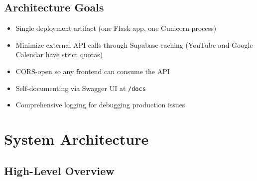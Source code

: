 \documentclass[12pt]{article}
\begin{document}
\subsection{Architecture Goals}
\begin{itemize}
    \item Single deployment artifact (one Flask app, one Gunicorn process)
    \item Minimize external API calls through Supabase caching (YouTube and Google Calendar have strict quotas)
    \item CORS-open so any frontend can consume the API
    \item Self-documenting via Swagger UI at \texttt{/docs}
    \item Comprehensive logging for debugging production issues
\end{itemize}

\section{System Architecture}

\subsection{High-Level Overview}
\end{document}
